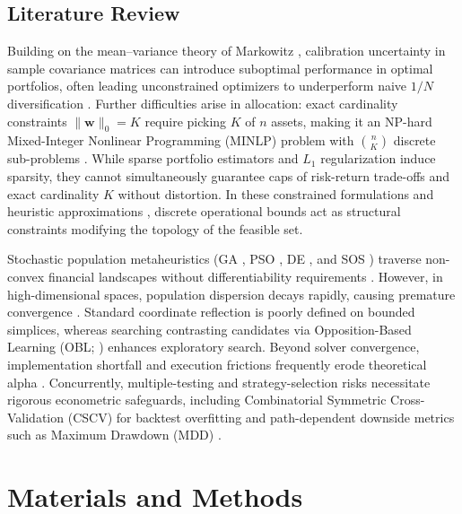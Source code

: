 \documentclass[11pt,a4paper]{article}
\begin{document}
\subsection{Literature Review}
Building on the mean--variance theory of Markowitz \cite{markowitz1952}, calibration uncertainty in sample covariance matrices can introduce suboptimal performance in optimal portfolios, often leading unconstrained optimizers to underperform naive $1/N$ diversification \cite{demiguel2009, olmo2023}. Further difficulties arise in allocation: exact cardinality constraints $\|\mathbf{w}\|_0 = K$ require picking $K$ of $n$ assets, making it an NP-hard Mixed-Integer Nonlinear Programming (MINLP) problem with $\binom{n}{K}$ discrete sub-problems \cite{woodside2011, li2024cardinality}. While sparse portfolio estimators \cite{brodie2009} and $L_1$ regularization induce sparsity, they cannot simultaneously guarantee caps of risk-return trade-offs and exact cardinality $K$ without distortion. In these constrained formulations and heuristic approximations \cite{bertsimas1999, fabozzi2007}, discrete operational bounds act as structural constraints modifying the topology of the feasible set.

Stochastic population metaheuristics (GA \citep{holland1992}, PSO \citep{kennedy1995}, DE \citep{storn1997}, and SOS \citep{cheng2014}) traverse non-convex financial landscapes without differentiability requirements \citep{maringer2005, corne2012, zheng2023}. However, in high-dimensional spaces, population dispersion decays rapidly, causing premature convergence \cite{bailey2024}. Standard coordinate reflection is poorly defined on bounded simplices, whereas searching contrasting candidates via Opposition-Based Learning (OBL; \cite{gopi2024, tizhoosh2005}) enhances exploratory search. Beyond solver convergence, implementation shortfall and execution frictions frequently erode theoretical alpha \cite{almgren2001, horst2024}. Concurrently, multiple-testing and strategy-selection risks necessitate rigorous econometric safeguards, including Combinatorial Symmetric Cross-Validation (CSCV) for backtest overfitting \cite{bailey2017, prado2018} and path-dependent downside metrics such as Maximum Drawdown (MDD) \cite{rockafellar2000, sortino1994, magdon2004, chekhlov2005}.

\section{Materials and Methods}
\end{document}
